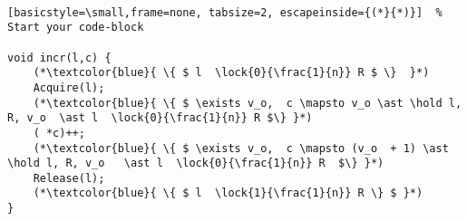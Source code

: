\documentclass[8pt]{article}
\newcommand{\lock}[2]{ \square \hspace{-1ex} \xrightarrow[#1]{#2}}
\newcommand{\hold}{\text{Hold }}
\begin{document}
\

\begin{lstlisting}[basicstyle=\small,frame=none, tabsize=2, escapeinside={(*}{*)}]  % Start your code-block

void incr(l,c) {
	(*\textcolor{blue}{ \{ $ l  \lock{0}{\frac{1}{n}} R $ \}  }*)
	Acquire(l);
	(*\textcolor{blue}{ \{ $ \exists v_o,  c \mapsto v_o \ast \hold l, R, v_o  \ast l  \lock{0}{\frac{1}{n}} R $\} }*)
	( *c)++;
	(*\textcolor{blue}{ \{ $ \exists v_o,  c \mapsto (v_o  + 1) \ast \hold l, R, v_o   \ast l  \lock{0}{\frac{1}{n}} R  $\} }*)
	Release(l);
	(*\textcolor{blue}{ \{ $ l  \lock{1}{\frac{1}{n}} R \} $ }*)
}
\end{lstlisting}


\newpage
\end{document}
